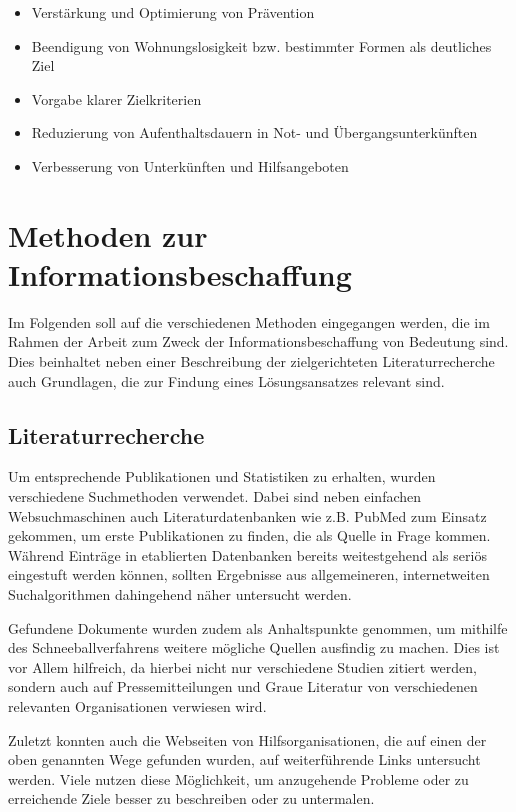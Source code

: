 \begin{itemize}
	\item Verstärkung und Optimierung von Prävention
	\item Beendigung von Wohnungslosigkeit bzw. bestimmter Formen als deutliches Ziel
	\item Vorgabe klarer Zielkriterien
	\item Reduzierung von Aufenthaltsdauern in Not- und Übergangsunterkünften
	\item Verbesserung von Unterkünften und Hilfsangeboten
\end{itemize}



\section{Methoden zur Informationsbeschaffung}

Im Folgenden soll auf die verschiedenen Methoden eingegangen werden, die im Rahmen der Arbeit zum Zweck der Informationsbeschaffung von Bedeutung sind. Dies beinhaltet neben einer Beschreibung der zielgerichteten Literaturrecherche auch Grundlagen, die zur Findung eines Lösungsansatzes relevant sind.

\subsection{Literaturrecherche}

Um entsprechende Publikationen und Statistiken zu erhalten, wurden verschiedene Suchmethoden verwendet. Dabei sind neben einfachen Websuchmaschinen auch Literaturdatenbanken wie z.B. PubMed zum Einsatz gekommen, um erste Publikationen zu finden, die als Quelle in Frage kommen. Während Einträge in etablierten Datenbanken bereits weitestgehend als seriös eingestuft werden können, sollten Ergebnisse aus allgemeineren, internetweiten Suchalgorithmen dahingehend näher untersucht werden.

Gefundene Dokumente wurden zudem als Anhaltspunkte genommen, um mithilfe des Schneeballverfahrens weitere mögliche Quellen ausfindig zu machen. Dies ist vor Allem hilfreich, da hierbei nicht nur verschiedene Studien zitiert werden, sondern auch auf Pressemitteilungen und Graue Literatur von verschiedenen relevanten Organisationen verwiesen wird.


Zuletzt konnten auch die Webseiten von Hilfsorganisationen, die auf einen der oben genannten Wege gefunden wurden, auf weiterführende Links untersucht werden. Viele nutzen diese Möglichkeit, um anzugehende Probleme oder zu erreichende Ziele besser zu beschreiben oder zu untermalen.

